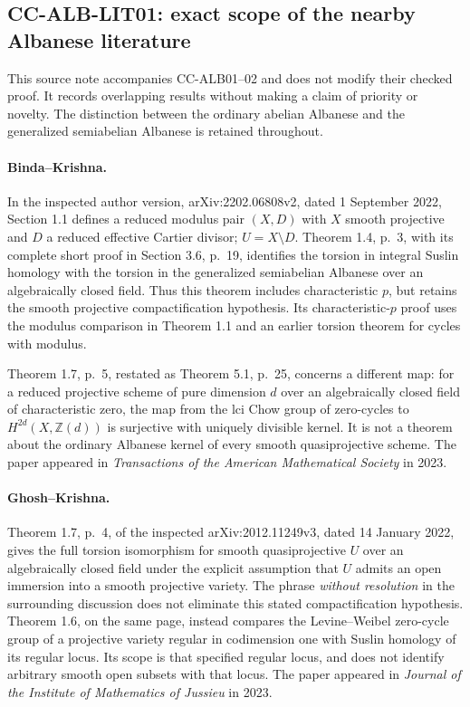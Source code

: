 \documentclass[11pt,a4paper]{article}
\theoremstyle{definition}\newtheorem{definition}[theorem]{Definition}
\theoremstyle{remark}\newtheorem{remark}[theorem]{Remark}
\begin{document}

\subsection{CC-ALB-LIT01: exact scope of the nearby Albanese literature}

This source note accompanies CC-ALB01--02 and does not modify their
checked proof. It records overlapping results without making a claim
of priority or novelty. The distinction between the ordinary abelian
Albanese and the generalized semiabelian Albanese is retained throughout.

\paragraph{Binda--Krishna.}
In the inspected author version, arXiv:2202.06808v2, dated 1 September
2022, Section 1.1 defines a reduced modulus pair \((X,D)\) with
\(X\) smooth projective and \(D\) a reduced effective Cartier divisor;
\(U=X\setminus D\). Theorem 1.4, p.~3, with its complete short proof in
Section 3.6, p.~19, identifies the torsion in integral Suslin homology
with the torsion in the generalized semiabelian Albanese over an
algebraically closed field. Thus this theorem includes characteristic
\(p\), but retains the smooth projective compactification hypothesis.
Its characteristic-\(p\) proof uses the modulus comparison in Theorem
1.1 and an earlier torsion theorem for cycles with modulus.

Theorem 1.7, p.~5, restated as Theorem 5.1, p.~25, concerns a different
map: for a reduced projective scheme of pure dimension \(d\) over an
algebraically closed field of characteristic zero, the map from the
lci Chow group of zero-cycles to \(H^{2d}(X,\mathbb Z(d))\) is
surjective with uniquely divisible kernel. It is not a theorem about
the ordinary Albanese kernel of every smooth quasiprojective scheme.
The paper appeared in \emph{Transactions of the American Mathematical
Society} in 2023.

\paragraph{Ghosh--Krishna.}
Theorem 1.7, p.~4, of the inspected arXiv:2012.11249v3, dated 14 January
2022, gives the full torsion isomorphism for smooth quasiprojective
\(U\) over an algebraically closed field under the explicit assumption
that \(U\) admits an open immersion into a smooth projective variety.
The phrase \emph{without resolution} in the surrounding discussion does
not eliminate this stated compactification hypothesis.
Theorem 1.6, on the same page, instead compares the Levine--Weibel
zero-cycle group of a projective variety regular in codimension one
with Suslin homology of its regular locus. Its scope is that specified
regular locus, and does not identify arbitrary smooth open subsets
with that locus. The paper appeared in \emph{Journal of the Institute
of Mathematics of Jussieu} in 2023.
\end{document}

